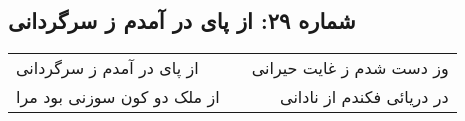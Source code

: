 \begin{center}
\section*{شماره ۲۹: از پای در آمدم ز سرگردانی}
\label{sec:029}
\begin{longtable}{l p{0.5cm} r}
از پای در آمدم ز سرگردانی
&&
وز دست شدم ز غایت حیرانی
\\
از ملک دو کون سوزنی بود مرا
&&
در دریائی فکندم از نادانی
\\
\end{longtable}
\end{center}
